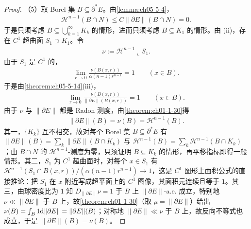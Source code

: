 \documentclass[../../main.tex]{subfiles}%
\begin{document}
\begin{proof}
（5）取 Borel 集 $B\subseteq\partial^*E$。由\cref{lemma:ch05-5-4}，%
\begin{align*}
\mathcal{H}^{n-1}(B\cap N)\leqslant C\lVert\partial E\rVert(B\cap N)=0 .
\end{align*}
于是只须考虑 $B\subseteq\bigcup_{k=1}^{\infty}K_k$ 的情形，进而只须考虑 $B\subseteq K_1$ 的情形。由 (ii)，存在 $C^1$ 超曲面 $S_1\supset K_1$。令
\begin{align*}
\nu:=\mathcal{H}^{n-1}\llcorner S_1 .
\end{align*}
由于 $S_1$ 是 $C^1$ 的，
\begin{align*}
\lim_{r\to0}\frac{\nu(B(x,r))}{\alpha(n-1)r^{n-1}}=1\qquad(x\in B).
\end{align*}
于是由\cref{theorem:ch05-5-14}(iii)，%
\begin{align*}
\lim_{r\to0}\frac{\nu(B(x,r))}{\lVert\partial E\rVert(B(x,r))}=1\qquad(x\in B).
\end{align*}
由于 $\nu$ 与 $\lVert\partial E\rVert$ 都是 Radon 测度，由\cref{theorem:ch01-1-30}得%
\begin{align*}
\lVert\partial E\rVert(B)=\nu(B)=\mathcal{H}^{n-1}(B).
\end{align*}
其一，$\{K_k\}$ 互不相交，故对每个 Borel 集 $B\subseteq\partial^*E$ 有 $\lVert\partial E\rVert(B)=\sum_k\lVert\partial E\rVert(B\cap K_k)$ 与 $\mathcal{H}^{n-1}(B)=\sum_k\mathcal{H}^{n-1}(B\cap K_k)$；由 $B\cap N$ 的 $\mathcal{H}^{n-1}$-测度为零，只须证明 $B\subseteq K_k$ 的情形，再平移指标即得一般情形。其二，$S_1$ 为 $C^1$ 超曲面时，对每个 $x\in S_1$ 有 $\mathcal{H}^{n-1}(S_1\cap B(x,r))/(\alpha(n-1)r^{n-1})\to1$，这是 $C^1$ 图形上面积公式的直接推论：把 $S_1$ 在 $x$ 附近写成超平面上的 $C^1$ 图像，其面积元连续且等于 $1$。其三，由球密度比为 $1$ 知 $D_{\lVert\partial E\rVert}\nu=1$ 于 $B$ 上 $\lVert\partial E\rVert$-a.e. 成立，特别地 $\nu\ll\lVert\partial E\rVert$ 于 $B$ 上，故\cref{theorem:ch01-1-30}（取 $\mu=\lVert\partial E\rVert$）给出 $\nu(B)=\int_B1\mathrm{d}\lVert\partial E\rVert=\lVert\partial E\rVert(B)$；对称地 $\lVert\partial E\rVert\ll\nu$ 于 $B$ 上，故反向不等式也成立，于是 $\lVert\partial E\rVert(B)=\nu(B)$。 %
\end{proof}
\end{document}
